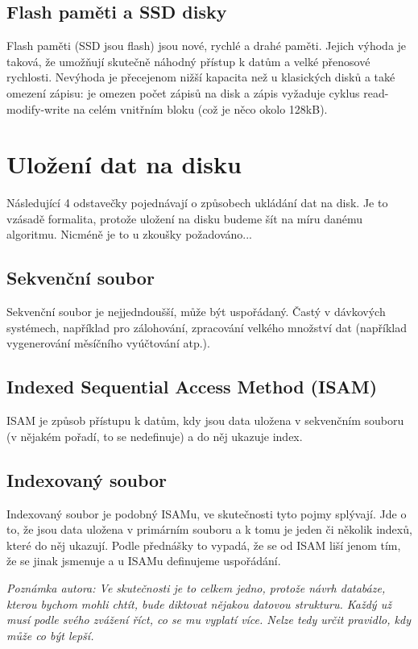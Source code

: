 \documentclass[a4paper,12pt]{article}
\begin{document}
\subsection{Flash paměti a SSD disky}
\setcounter{equation}{0}
Flash paměti (SSD jsou flash) jsou nové, rychlé a drahé paměti. Jejich výhoda je 
taková, že umožňují skutečně náhodný přístup k datům a velké přenosové 
rychlosti. Nevýhoda je přecejenom nižší kapacita než u klasických disků a také 
omezení zápisu: je omezen počet zápisů na disk a zápis vyžaduje cyklus 
read-modify-write na celém vnitřním bloku (což je něco okolo 128kB).


\section{Uložení dat na disku}
\setcounter{equation}{0}
Následující 4 odstavečky pojednávají o způsobech ukládání dat na disk. Je to 
vzásadě formalita, protože uložení na disku budeme šít na míru danému algoritmu.  
Nicméně je to u zkoušky požadováno...

\subsection{Sekvenční soubor}
\setcounter{equation}{0}
Sekvenční soubor je nejjedndoušší, může být uspořádaný. Častý v dávkových 
systémech, například pro zálohování, zpracování velkého množství dat (například 
vygenerování měsíčního vyúčtování atp.).

\subsection{Indexed Sequential Access Method (ISAM)}
\setcounter{equation}{0}
ISAM je způsob přístupu k datům, kdy jsou data uložena v sekvenčním souboru (v 
nějakém pořadí, to se nedefinuje) a do něj ukazuje index.

\subsection{Indexovaný soubor}
\setcounter{equation}{0}
Indexovaný soubor je podobný ISAMu, ve skutečnosti tyto pojmy splývají. Jde o 
to, že jsou data uložena v primárním souboru a k tomu je jeden či několik 
indexů, které do něj ukazují. Podle přednášky to vypadá, že se od ISAM liší 
jenom tím, že se jinak jsmenuje a u ISAMu definujeme uspořádání.

\textit{Poznámka autora: Ve skutečnosti je to celkem jedno, protože návrh 
databáze, kterou bychom mohli chtít, bude diktovat nějakou datovou strukturu.  
Každý už musí podle svého zvážení říct, co se mu vyplatí více. Nelze tedy určit 
pravidlo, kdy může co být lepší.}
\end{document}
